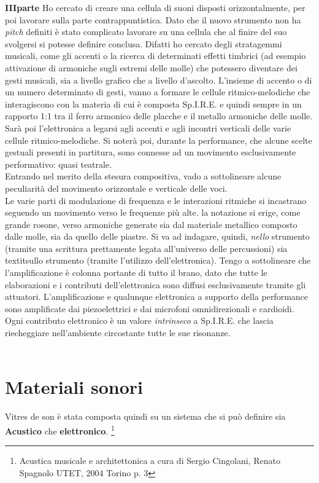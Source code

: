 \textbf{IIIparte}
Ho cercato di creare una cellula di suoni disposti orizzontalmente, per poi lavorare sulla parte contrappuntistica. Dato che il nuovo strumento non ha \textit{pitch} definiti è stato complicato lavorare su una cellula che al finire del suo svolgersi si potesse definire conclusa. Difatti ho cercato degli stratagemmi musicali, come gli accenti o la ricerca di determinati effetti timbrici (ad esempio attivazione di armoniche sugli estremi delle molle) che potessero diventare dei gesti musicali, sia a livello grafico che a livello d'ascolto. L'insieme di accento o di un numero determinato di gesti, vanno a formare le cellule ritmico-melodiche che interagiscono con la materia di cui è composta Sp.I.R.E. e quindi sempre in un rapporto 1:1 tra il ferro armonico delle placche e il metallo armoniche delle molle.
Sarà poi l'elettronica a legarsi agli accenti e agli incontri verticali delle varie cellule ritmico-melodiche. Si noterà poi, durante la performance, che alcune scelte gestuali presenti in partitura, sono connesse ad un movimento esclusivamente performativo: quasi teatrale.\\
Entrando nel merito della stesura compositiva, vado a sottolineare alcune peculiarità del movimento orizzontale e verticale delle voci. \\
Le varie parti di modulazione di frequenza e le interazioni ritmiche si incastrano seguendo un movimento verso le frequenze più alte.  la notazione si erige, come grande rosone, verso armoniche generate sia dal materiale metallico composto dalle molle, sia da quello delle piastre. Si va ad indagare, quindi, \textit{nello} strumento (tramite una scrittura prettamente legata all'universo delle percussioni) sia textit{sullo} strumento (tramite l'utilizzo dell'elettronica). Tengo a sottolineare che l'amplificazione è colonna portante di tutto il brano, dato che tutte le elaborazioni e i contributi dell'elettronica sono diffusi esclusivamente tramite gli attuatori. L'amplificazione e qualunque elettronica a supporto della performance sono amplificate dai piezoelettrici e dai microfoni omnidirezionali e cardioidi. \\
Ogni contributo elettronico è un valore \textit{intrinseco} a Sp.I.R.E. che lascia riecheggiare nell'ambiente circostante tutte le sue risonanze.
\\
\\

\section{Materiali sonori}
Vitres de son è stata composta quindi su un sistema che si può definire sia \textbf{Acustico} che \textbf{elettronico}. \footnote{Acustica musicale e architettonica a cura di Sergio Cingolani, Renato Spagnolo UTET, 2004 Torino p. 3}

